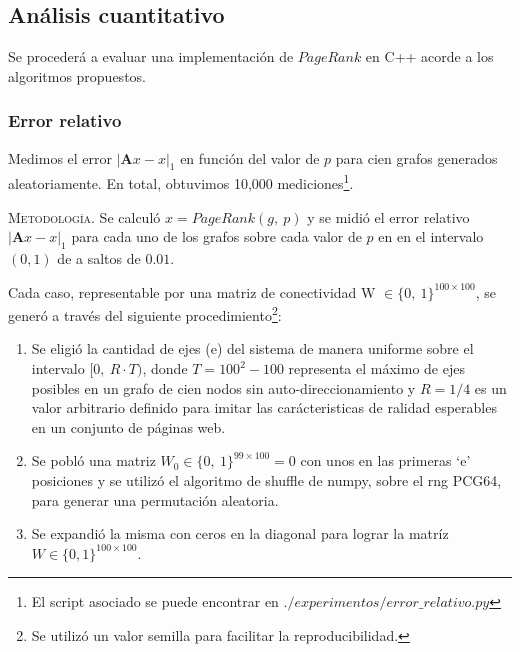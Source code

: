 \vspace{1em}

\subsection{Análisis cuantitativo}\label{cuantitativo} Se procederá a evaluar una implementación de $PageRank$ en C++ acorde a los algoritmos propuestos.

\vspace{2em}
\subsubsection{Error relativo} Medimos el error $|\mathbf{A}x - x|_1$ en función del valor de $p$ para cien grafos generados aleatoriamente. En total, obtuvimos 10,000 mediciones\footnote{El script asociado se puede encontrar en $./experimentos/error\_relativo.py$}.  
\vspace{1em}

\noindent \textsc{Metodología}. Se calculó  $x = PageRank(g,\ p)$ y se midió el error relativo $|\mathbf{A}x - x|_1$ para cada uno de los grafos sobre cada valor de $p$ en en el intervalo $(0, 1)$ de a saltos de $0.01$.
\vspace{1em}

\noindent Cada caso, representable por una matriz de conectividad W $\in \{0,\ 1\}^{100 \times 100}$, se generó a través del siguiente procedimiento\footnote{Se utilizó un valor semilla para facilitar la reproducibilidad.}:
\vspace{1em}

\begin{enumerate}
    \item Se eligió  la cantidad de ejes (e) del sistema de manera uniforme sobre el intervalo $[0,\ R \cdot T)$, donde $T = 100^2 - 100$ representa el máximo de ejes posibles en un grafo de cien nodos sin auto-direccionamiento y $R = 1/4$ es un valor arbitrario definido para imitar las carácteristicas de ralidad esperables en un conjunto de páginas web.
    \item Se pobló una matriz $W_0 \in \{0,\ 1\}^{99 \times 100} = 0$ con unos en las primeras `e' posiciones y se utilizó el algoritmo de shuffle de numpy, sobre el rng \textsc{PCG64}, para generar una permutación aleatoria.
    \item Se expandió la misma con ceros en la diagonal para lograr la matríz $W \in \{0, 1\}^{100 \times 100}$. 
\end{enumerate}
\vspace{1em}


